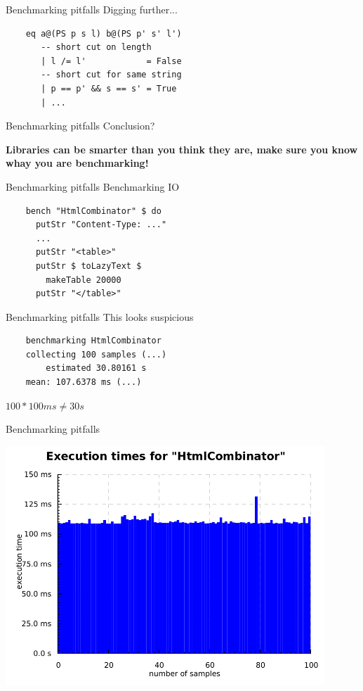 \documentclass[20pt]{beamer}
\newcommand{\vspaced}{
    \vspace{5mm}
}
\begin{document}
\begin{frame}[fragile]{Benchmarking pitfalls}
    Digging further... \\
    \vspaced
    \begin{lstlisting}
    eq a@(PS p s l) b@(PS p' s' l')
       -- short cut on length
       | l /= l'            = False
       -- short cut for same string
       | p == p' && s == s' = True
       | ...
    \end{lstlisting}
\end{frame}

\begin{frame}{Benchmarking pitfalls}
    Conclusion? \\
    \vspaced
    \textbf{Libraries can be smarter than you think they are, make sure you know
    whay you are benchmarking!}
\end{frame}

\begin{frame}[fragile]{Benchmarking pitfalls}
    Benchmarking IO \\
    \vspaced
    \begin{lstlisting}
    bench "HtmlCombinator" $ do
      putStr "Content-Type: ..."
      ...
      putStr "<table>"
      putStr $ toLazyText $
        makeTable 20000
      putStr "</table>"
    \end{lstlisting}
\end{frame}

\begin{frame}[fragile]{Benchmarking pitfalls}
    This looks suspicious \\
    \vspaced
    \begin{lstlisting}
    benchmarking HtmlCombinator
    collecting 100 samples (...)
        estimated 30.80161 s
    mean: 107.6378 ms (...)
    \end{lstlisting}
    \vspaced
    $100 * 100ms \neq 30s$
\end{frame}

\begin{frame}{Benchmarking pitfalls}
    \begin{center}
    \includegraphics[width=0.9\textwidth]{images/htmlcombinator.pdf}
    \end{center}
\end{frame}
\end{document}
